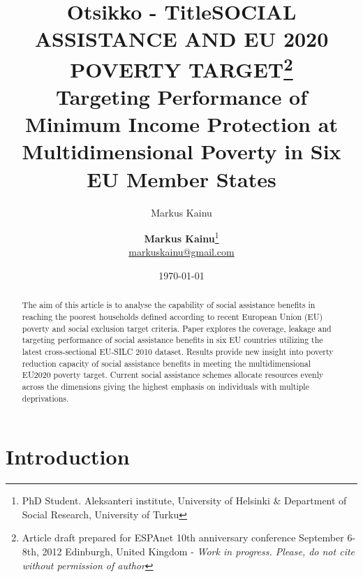 \documentclass[11pt, a4paper]{article}\usepackage{graphicx, color}
\author{Markus Kainu}
\title{Otsikko - Title}
\begin{document}
\title{SOCIAL ASSISTANCE AND EU 2020 POVERTY TARGET\footnote{Article draft prepared for ESPAnet 10th anniversary conference September 6-8th, 2012 Edinburgh, United Kingdom - \emph{Work in progress. Please, do not cite without permission of author}} \\
Targeting Performance of Minimum Income Protection at Multidimensional Poverty in Six EU Member States}


\author{\textbf{Markus Kainu}\thanks{PhD Student. Aleksanteri institute, University of Helsinki \& Department of Social Research, University of Turku}\\ 
\href{mailto:markuskainu@gmail.com}{markuskainu@gmail.com}}

\date{\today}
\maketitle

\begin{abstract}
The aim of this article is to analyse the capability of social assistance benefits in reaching the poorest households defined according to recent European Union (EU) poverty and social exclusion target criteria. Paper explores the coverage, leakage and targeting performance of social assistance benefits in six EU countries utilizing the latest cross-sectional EU-SILC 2010 dataset. Results provide new insight into poverty reduction capacity of social assistance benefits in meeting the multidimensional EU2020 poverty target. Current social assistance schemes allocate resources evenly across the dimensions giving the highest emphasis on individuals with multiple deprivations.

\end{abstract}

\thispagestyle{empty}

\newpage
\tableofcontents
\newpage
\listoffigures
\listoftables


\thispagestyle{empty}




\newpage
\setcounter{page}{1}
\section{Introduction}
\end{document}
